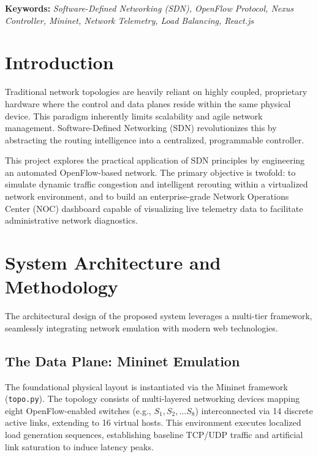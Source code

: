 \documentclass[12pt,a4paper]{article}
\begin{document}
\vspace{0.5cm}
\textbf{Keywords:} \textit{Software-Defined Networking (SDN), OpenFlow Protocol, Nexus Controller, Mininet, Network Telemetry, Load Balancing, React.js}

\newpage
\tableofcontents
\newpage


\section{Introduction}
Traditional network topologies are heavily reliant on highly coupled, proprietary hardware where the control and data planes reside within the same physical device. This paradigm inherently limits scalability and agile network management. Software-Defined Networking (SDN) revolutionizes this by abstracting the routing intelligence into a centralized, programmable controller. 

This project explores the practical application of SDN principles by engineering an automated OpenFlow-based network. The primary objective is twofold: to simulate dynamic traffic congestion and intelligent rerouting within a virtualized network environment, and to build an enterprise-grade Network Operations Center (NOC) dashboard capable of visualizing live telemetry data to facilitate administrative network diagnostics.

\section{System Architecture and Methodology}
The architectural design of the proposed system leverages a multi-tier framework, seamlessly integrating network emulation with modern web technologies.

\subsection{The Data Plane: Mininet Emulation}
The foundational physical layout is instantiated via the Mininet framework (\texttt{topo.py}). The topology consists of multi-layered networking devices mapping eight OpenFlow-enabled switches (e.g., $S_1, S_2, ... S_8$) interconnected via 14 discrete active links, extending to 16 virtual hosts. This environment executes localized load generation sequences, establishing baseline TCP/UDP traffic and artificial link saturation to induce latency peaks.
\end{document}
